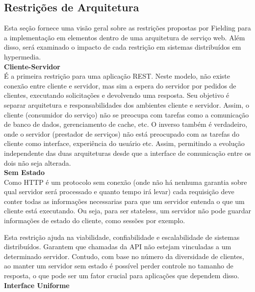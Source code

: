 \subsection[Restrições de Arquitetura]{Restrições de Arquitetura}

Esta seção fornece uma visão geral sobre as restrições propostas por Fielding para a implementação em elementos dentro de uma arquitetura de serviço web. Além disso, será examinado o impacto de cada restrição em sistemas distribuídos em hypermedia. \\

\textbf{Cliente-Servidor} \\

É a primeira restrição para uma aplicação REST.  Neste modelo, não existe conexão entre cliente e servidor, mas sim a espera do servidor por pedidos de clientes, executando solicitações e devolvendo uma resposta. Seu objetivo é separar arquitetura e responsabilidades dos ambientes cliente e servidor. Assim, o cliente (consumidor do serviço) não se preocupa com tarefas como a comunicação de banco de dados, gerenciamento de cache, etc. O inverso também é verdadeiro, onde o servidor (prestador de serviços) não está preocupado com as tarefas do cliente como interface, experiência do usuário etc. Assim, permitindo a evolução independente das duas arquiteturas desde que a interface de comunicação entre os dois não seja alterada. \cite{Fielding2000} \\

\textbf{Sem Estado} \\

Como HTTP é um protocolo sem conexão (onde não há nenhuma garantia sobre qual servidor será processado e quanto tempo irá levar) cada requisição deve conter todas as informações necessarias para que um servidor entenda o que um cliente está executando. Ou seja, para ser stateless, um servidor não pode guardar informações de estado do cliente, como sessões por exemplo. \cite{Fielding2000}

Esta restrição ajuda na viabilidade, confiabilidade e escalabilidade de sistemas distribuídos. Garantem que chamadas da API não estejam vinculadas a um determinado servidor. Contudo, com base no número da diversidade de clientes, ao manter um servidor sem estado é possível perder controle no tamanho de resposta, o que pode ser um fator crucial para aplicações que dependem disso. \cite{Wildermuth2015} \\

\textbf{Interface Uniforme} \\

